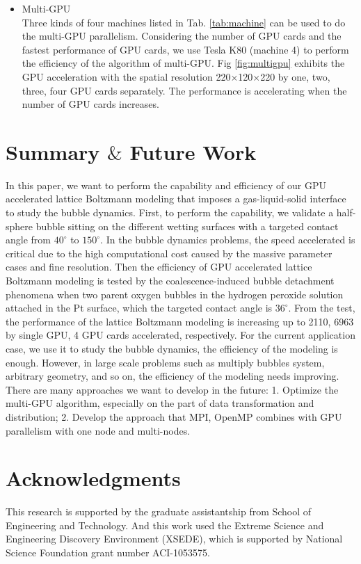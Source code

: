 \documentclass[10pt]{elsarticle}
\begin{document}
\begin{itemize}
\item Multi-GPU\\
Three kinds of four machines listed in Tab. \ref{tab:machine} can be used to do the multi-GPU parallelism. Considering the number of GPU cards and the fastest performance of GPU cards, we use Tesla K80 (machine 4) to perform the efficiency of the algorithm of multi-GPU. Fig \ref{fig:multigpu} exhibits the GPU acceleration with the spatial resolution 220$\times$120$\times$220 by one, two, three, four GPU cards separately. The performance is accelerating when the number of GPU cards increases.  
\end{itemize}

\section{Summary $\&$ Future Work}
\label{sec:Sum}
In this paper, we want to perform the capability and efficiency of our GPU accelerated lattice Boltzmann modeling that imposes a gas-liquid-solid interface to study the bubble dynamics. First, to perform the capability, we validate a half-sphere bubble sitting on the different wetting surfaces with a targeted contact angle from $40^\circ$ to $150^\circ$. In the bubble dynamics problems, the speed accelerated is critical due to the high computational cost caused by the massive parameter cases and fine resolution. Then the efficiency of GPU accelerated lattice Boltzmann modeling is tested by the coalescence-induced bubble detachment phenomena when two parent oxygen bubbles in the hydrogen peroxide solution attached in the Pt surface, which the targeted contact angle is $ 36^\circ$. From the test, the performance of the lattice Boltzmann modeling is increasing up to 2110, 6963 by single GPU, 4 GPU cards accelerated, respectively. For the current application case, we use it to study the bubble dynamics, the efficiency of the modeling is enough. However, in large scale problems such as multiply bubbles system, arbitrary geometry, and so on, the efficiency of the modeling needs improving. There are many approaches we want to develop in the future: 1. Optimize the multi-GPU algorithm, especially on the part of data transformation and distribution; 2. Develop the approach that MPI, OpenMP combines with GPU parallelism with one node and multi-nodes.     

\section*{Acknowledgments}
This research is supported by the graduate assistantship from School of Engineering and Technology. And this work used the Extreme Science and Engineering Discovery Environment (XSEDE), which is supported by National Science Foundation grant number ACI-1053575.
\end{document}
